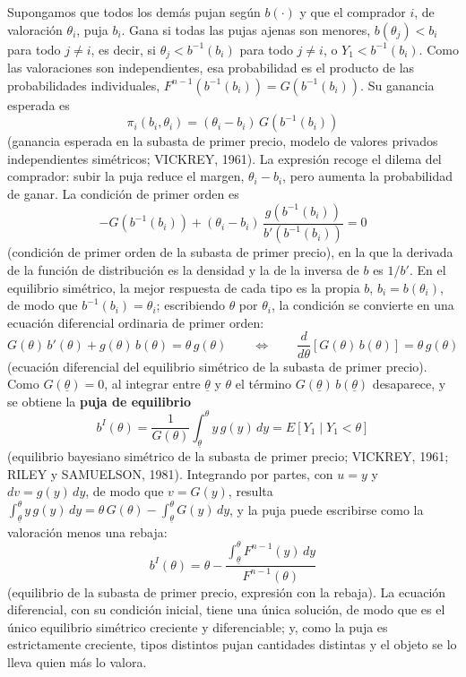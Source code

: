 \documentclass[10pt,a4paper]{article}
\begin{document}
Supongamos que todos los demás pujan según $b(\cdot)$ y que el comprador $i$, de valoración $\theta_i$, puja $b_i$. Gana si todas las pujas ajenas son menores, $b(\theta_j)<b_i$ para todo $j\neq i$, es decir, si $\theta_j<b^{-1}(b_i)$ para todo $j\neq i$, o $Y_1<b^{-1}(b_i)$. Como las valoraciones son independientes, esa probabilidad es el producto de las probabilidades individuales, $F^{n-1}\left(b^{-1}(b_i)\right)=G\left(b^{-1}(b_i)\right)$. Su ganancia esperada es
$$\pi_i(b_i,\theta_i)=(\theta_i-b_i)\,G\left(b^{-1}(b_i)\right)$$
(ganancia esperada en la subasta de primer precio, modelo de valores privados independientes simétricos; VICKREY, 1961). La expresión recoge el dilema del comprador: subir la puja reduce el margen, $\theta_i-b_i$, pero aumenta la probabilidad de ganar. La condición de primer orden es
$$-G\left(b^{-1}(b_i)\right)+(\theta_i-b_i)\,\frac{g\left(b^{-1}(b_i)\right)}{b'\left(b^{-1}(b_i)\right)}=0$$
(condición de primer orden de la subasta de primer precio), en la que la derivada de la función de distribución es la densidad y la de la inversa de $b$ es $1/b'$. En el equilibrio simétrico, la mejor respuesta de cada tipo es la propia $b$, $b_i=b(\theta_i)$, de modo que $b^{-1}(b_i)=\theta_i$; escribiendo $\theta$ por $\theta_i$, la condición se convierte en una ecuación diferencial ordinaria de primer orden:
$$G(\theta)\,b'(\theta)+g(\theta)\,b(\theta)=\theta\,g(\theta)\qquad\Longleftrightarrow\qquad\frac{d}{d\theta}\left[G(\theta)\,b(\theta)\right]=\theta\,g(\theta)$$
(ecuación diferencial del equilibrio simétrico de la subasta de primer precio). Como $G(\underline{\theta})=0$, al integrar entre $\underline{\theta}$ y $\theta$ el término $G(\underline{\theta})\,b(\underline{\theta})$ desaparece, y se obtiene la \textbf{puja de equilibrio}
$$b^{I}(\theta)=\frac{1}{G(\theta)}\int_{\underline{\theta}}^{\theta}y\,g(y)\,dy=E\left[Y_1\mid Y_1<\theta\right]$$
(equilibrio bayesiano simétrico de la subasta de primer precio; VICKREY, 1961; RILEY y SAMUELSON, 1981). Integrando por partes, con $u=y$ y $dv=g(y)\,dy$, de modo que $v=G(y)$, resulta $\int_{\underline{\theta}}^{\theta}y\,g(y)\,dy=\theta\,G(\theta)-\int_{\underline{\theta}}^{\theta}G(y)\,dy$, y la puja puede escribirse como la valoración menos una rebaja:
$$b^{I}(\theta)=\theta-\frac{\int_{\underline{\theta}}^{\theta}F^{n-1}(y)\,dy}{F^{n-1}(\theta)}$$
(equilibrio de la subasta de primer precio, expresión con la rebaja). La ecuación diferencial, con su condición inicial, tiene una única solución, de modo que es el único equilibrio simétrico creciente y diferenciable; y, como la puja es estrictamente creciente, tipos distintos pujan cantidades distintas y el objeto se lo lleva quien más lo valora.
\end{document}
